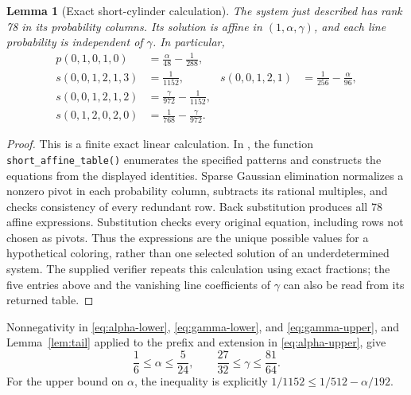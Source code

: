 \documentclass[11pt]{article}
\newtheorem{lemma}[theorem]{Lemma}
\begin{document}
\begin{lemma}[Exact short-cylinder calculation]\label{lem:short-table}
The system just described has rank 78 in its probability columns. Its
solution is affine in $(1,\alpha,\gamma)$, and each line probability is
independent of $\gamma$. In particular,
\begin{align}
p(0,1,0,1,0)&=\frac\alpha{48}-\frac1{288},\label{eq:alpha-lower}\\
s(0,0,1,2,1,3)&=\frac1{1152},&
s(0,0,1,2,1)&=\frac1{256}-\frac\alpha{96},\label{eq:alpha-upper}\\
s(0,0,1,2,1,2)&=\frac\gamma{972}-\frac1{1152},\label{eq:gamma-lower}\\
s(0,1,2,0,2,0)&=\frac1{768}-\frac\gamma{972}.
\label{eq:gamma-upper}
\end{align}
\end{lemma}
\begin{proof}
This is a finite exact linear calculation. In
, the function \texttt{short\_affine\_table()}
enumerates the specified patterns and constructs the equations from the
displayed identities. Sparse Gaussian elimination normalizes a nonzero
pivot in each probability column, subtracts its rational multiples, and
checks consistency of every redundant row. Back substitution produces all
78 affine expressions. Substitution checks every original equation,
including rows not chosen as pivots. Thus the expressions are the unique
possible values for a hypothetical coloring, rather than one selected
solution of an underdetermined system. The supplied verifier repeats this
calculation using exact fractions; the five entries above and the vanishing
line coefficients of $\gamma$ can also be read from its returned table.
\end{proof}

Nonnegativity in \eqref{eq:alpha-lower}, \eqref{eq:gamma-lower}, and
\eqref{eq:gamma-upper}, and Lemma~\ref{lem:tail} applied to the prefix and
extension in \eqref{eq:alpha-upper}, give
\begin{equation}\label{eq:box}
\frac16\leq\alpha\leq\frac5{24},\qquad
\frac{27}{32}\leq\gamma\leq\frac{81}{64}.
\end{equation}
For the upper bound on $\alpha$, the inequality is explicitly
$1/1152\leq1/512-\alpha/192$.
\end{document}
